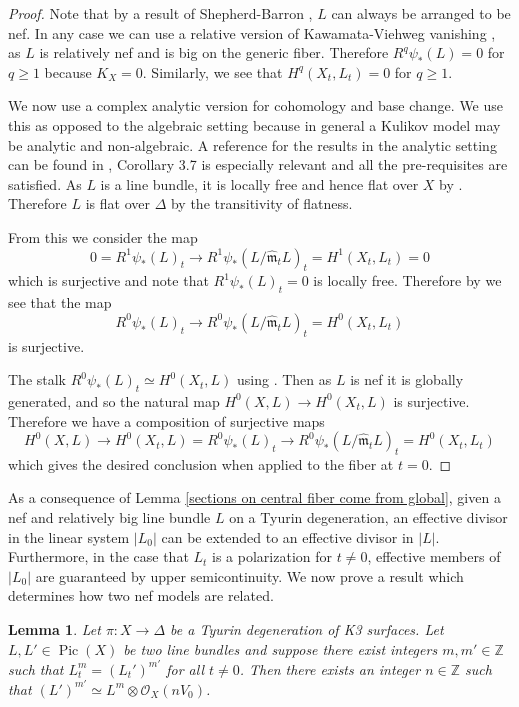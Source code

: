 \documentclass[a4paper]{amsart}
\theoremstyle{definition}
\theoremstyle{plain}
\newtheorem{lemma}[defn]{Lemma}
\theoremstyle{remark}
\newcommand{\Z}{\mathbb{Z}}
\begin{document}
\begin{proof}
Note that by a result of Shepherd-Barron \cite[Corollary 3.1]{SB83}, $L$ can always be arranged to be nef. In any case we can use a relative version of Kawamata-Viehweg vanishing \cite[Theorem 2.1]{Ancona87}, as $L$ is relatively nef and is big on the generic fiber. Therefore $R^q\psi_*(L) = 0$ for $q \geq 1$ because $K_{X}=0$. Similarly, we see that $H^q(X_t,L_t)=0$ for $q\geq 1$.

We now use a complex analytic version for cohomology and base change. We use this as opposed to the algebraic setting because in general a Kulikov model may be analytic and non-algebraic. A reference for the results in the analytic setting can be found in \cite[Chapter III.3]{GlobalTheory}, Corollary 3.7 is especially relevant and all the pre-requisites are satisfied. As $L$ is a line bundle, it is locally free and hence flat over $X$ by \cite[III.9.2]{Har77}. Therefore $L$ is flat over $\Delta$ by the transitivity of flatness.

From this we consider the map
$$0=R^1\psi_*(L)_t\rightarrow R^1\psi_*(L/\hat{\mathfrak{m}}_tL)_t=H^1(X_t,L_t)=0$$
which is surjective and note that  $R^1\psi_*(L)_t=0$ is locally free. Therefore by \cite[Corollary III.3.7]{GlobalTheory} we see that the map
$$R^0\psi_*(L)_t\rightarrow R^0\psi_*(L/\hat{\mathfrak{m}}_tL)_t=H^0(X_t,L_t)$$
is surjective.

The stalk $R^0\psi_*(L)_t \simeq H^0(X_t,L)$ using \cite[Lemma III.1.3]{GlobalTheory}. Then as $L$ is nef it is globally generated, and so the natural map $H^0(X,L)\rightarrow H^0(X_t,L)$ is surjective. Therefore we have a composition of surjective maps $$H^0(X,L)\rightarrow H^0(X_t,L)=R^0\psi_*(L)_t\rightarrow R^0\psi_*(L/\hat{\mathfrak{m}}_tL)_t=H^0(X_t,L_t)$$ which gives the desired conclusion when applied to the fiber at $t=0$.
\end{proof}
As a consequence of Lemma \ref{sections on central fiber come from global}, given a nef and relatively big line bundle $L$ on a Tyurin degeneration, an effective divisor in the linear system $|L_0|$ can be extended to an effective divisor in $|L|$. Furthermore, in the case that $L_t$ is a polarization for $t \neq 0$, effective members of $|L_0|$ are guaranteed by upper semicontinuity.
We now prove a result which determines how two nef models are related.

\begin{lemma}\label{nef polarisations are related}
Let $\pi:X\rightarrow \Delta$ be a Tyurin degeneration of K3 surfaces. Let $L,L'\in \operatorname{Pic}(X)$ be two line bundles and suppose there exist integers $m,m'\in\Z$ such that $L_t^m=(L_t')^{m'}$ for all $t\neq0$. Then there exists an integer $n\in\Z$ such that $(L')^{m'}\simeq L^m\otimes\mathcal{O}_X(nV_0)$.
\end{lemma}
\end{document}

